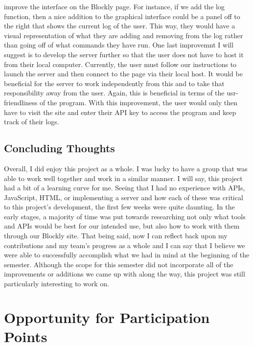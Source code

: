 \documentclass{article}
\theoremstyle{theorem}
\theoremstyle{definition}
\theoremstyle{remark}
\begin{document}
improve the interface on the Blockly page. For instance, if we add the log function, then a nice addition to the graphical interface could be a panel off to the right that shows the current log of the user. This way, they would have a visual representation of what they are adding and removing from the log rather than going off of what commands they have run. 
One last improvemnt I will suggest is to develop the server further so that the user does not have to host it from their local computer. Currently, the user must follow our instructions to launch the server and then connect to the page via their local host. It would be beneficial for the server to work independently from this and to take that responsibility away from 
the user. Again, this is beneficial in terms of the usr-friendliness of the program. With this improvement, the user would only then have to visit the site and enter their API key to access the program and keep track of their logs. \\


\subsection{Concluding Thoughts}

Overall, I did enjoy this project as a whole. I was lucky to have a group that was able to work well together and work in a similar manner. I will say, this project had a bit of a learning curve for me. Seeing that I had no experience with APIs, JavaScript, HTML, or implementing a server and how each of these was critical to this project's development, the first 
few weeks were quite daunting. In the early stages, a majority of time was put towards researching not only what tools and APIs would be best for our intended use, but also how to work with them through our Blockly site. That being said, now I can reflect back upon my contributions and my team's progress as a whole and I can say that I believe we were able 
to successfully accomplish what we had in mind at the beginning of the semester. Although the scope for this semester did not incorporate all of the improvements or additions we came up with along the way, this project was still particularly interesting to work on. \\


\section{Opportunity for Participation Points}\label{Opportunity for Participation Points}
\end{document}
